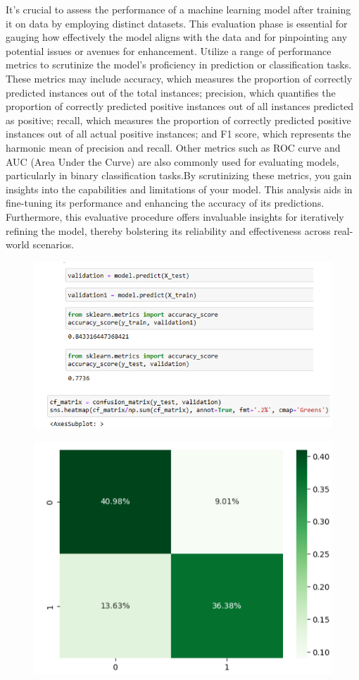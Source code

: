 \begin{description}
It's crucial to assess the performance of a machine learning model after training it on data by employing distinct datasets. This evaluation phase is essential for gauging how effectively the model aligns with the data and for pinpointing any potential issues or avenues for enhancement. Utilize a range of performance metrics to scrutinize the model's proficiency in prediction or classification tasks. 
\\
These metrics may include accuracy, which measures the proportion of correctly predicted instances out of the total instances; precision, which quantifies the proportion of correctly predicted positive instances out of all instances predicted as positive; recall, which measures the proportion of correctly predicted positive instances out of all actual positive instances; and F1 score, which represents the harmonic mean of precision and recall. Other metrics such as ROC curve and AUC (Area Under the Curve) are also commonly used for evaluating models, particularly in binary classification tasks.By scrutinizing these metrics, you gain insights into the capabilities and limitations of your model. This analysis aids in fine-tuning its performance and enhancing the accuracy of its predictions. Furthermore, this evaluative procedure offers invaluable insights for iteratively refining the model, thereby bolstering its reliability and effectiveness across real-world scenarios.
 \begin{figure}[hbt!]
  \centering
 \includegraphics[width=0.8\linewidth]{C_chap/fig18.png}
\end{figure}
 \begin{figure}[hbt!]
  \centering
 \includegraphics[width=0.8\linewidth]{C_chap/fig19.png}

\end{figure}
\end{description}
